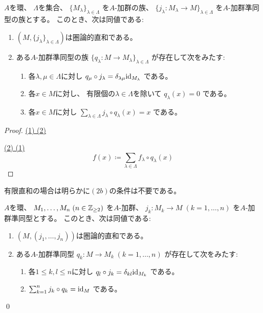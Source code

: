 \documentclass[report]{jlreq}
\begin{document}
\begin{proposition}[直和の特徴付け]
    $A$を環、
    $\Lambda$を集合、
    $\{ M_\lambda \}_{\lambda \in \Lambda}$
    を$A$-加群の族、
    $\{ j_\lambda \colon M_\lambda \to M \}_{\lambda \in \Lambda}$
    を$A$-加群準同型の族とする。
    このとき、次は同値である:
    \begin{enumerate}
        \item $(M, \{ j_\lambda \}_{\lambda \in \Lambda})$は圏論的直和である。
        \item ある$A$-加群準同型の族
            $\{ q_\lambda \colon M \to M_\lambda \}_{\lambda \in \Lambda}$
            が存在して次をみたす:
            \begin{enumerate}
                \item 各$\lambda, \mu \in \Lambda$に対し
                    $q_\mu \circ j_\lambda = \delta_{\lambda \mu} \mathrm{id}_{M_\lambda}$
                    である。
                \item 各$x \in M$に対し、
                    有限個の$\lambda \in \Lambda$を除いて
                    $q_\lambda(x) = 0$
                    である。
                \item 各$x \in M$に対し
                    $\sum_{\lambda \in \Lambda} j_\lambda \circ q_\lambda(x) = x$
                    である。
            \end{enumerate}
    \end{enumerate}
\end{proposition}

\begin{proof}
    \uline{(1) \Rightarrow (2)} \quad
    \TODO{}

    \uline{(2) \Rightarrow (1)} \quad
    \begin{equation}
        f(x) \coloneqq
            \sum_{\lambda \in \Lambda}
            f_\lambda \circ q_\lambda(x)
    \end{equation}
    \TODO{}
\end{proof}

有限直和の場合は明らかに$(2b)$の条件は不要である。

\begin{corollary}[有限直和の特徴付け]
    $A$を環、
    $M_1, \dots, M_n \; (n \in \mathbb{Z}_{\ge 2})$
    を$A$-加群、
    $j_k \colon M_k \to M \; (k = 1, \dots, n)$
    を$A$-加群準同型とする。
    このとき、次は同値である:
    \begin{enumerate}
        \item $(M, (j_1, \dots, j_n))$は圏論的直和である。
        \item ある$A$-加群準同型
            $q_k \colon M \to M_k \; (k = 1, \dots, n)$
            が存在して次をみたす:
            \begin{enumerate}
                \item 各$1 \le k, l \le n$に対し
                    $q_l \circ j_k = \delta_{kl} \mathrm{id}_{M_k}$
                    である。
                \item $\sum_{k = 1}^n j_k \circ q_k = \mathrm{id}_M$
                    である。
            \end{enumerate}
    \end{enumerate}
    \qed
\end{corollary}
\end{document}
